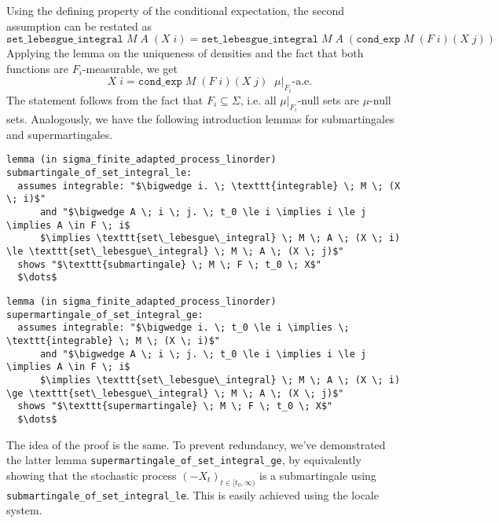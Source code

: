 Using the defining property of the conditional expectation, the second assumption can be restated as
\[
	\texttt{set\_lebesgue\_integral} \; M \; A \; (X \; i) = \texttt{set\_lebesgue\_integral} \; M \; A \; (\texttt{cond\_exp} \; M \; (F \; i) (X \; j))
\]
Applying the lemma on the uniqueness of densities and the fact that both functions are $F_i$-measurable, we get
\[
	\quad X \; i = \texttt{cond\_exp} \; M \; (F \; i) (X \; j) \;\; \mu\vert_{F_i}\textrm{-a.e.}
\]
The statement follows from the fact that $F_i \subseteq \Sigma$, i.e. all $\mu\vert_{F_i}$-null sets are $\mu$-null sets. Analogously, we have the following introduction lemmas for submartingales and supermartingales.

\begin{isalemma}
{\small
\begin{lstlisting}[style=isabelle]
lemma (in sigma_finite_adapted_process_linorder) submartingale_of_set_integral_le:
  assumes integrable: "$\bigwedge i. \; \texttt{integrable} \; M \; (X \; i)$"
      and "$\bigwedge A \; i \; j. \; t_0 \le i \implies i \le j \implies A \in F \; i$
	  $\implies \texttt{set\_lebesgue\_integral} \; M \; A \; (X \; i) \le \texttt{set\_lebesgue\_integral} \; M \; A \; (X \; j)$" 
  shows "$\texttt{submartingale} \; M \; F \; t_0 \; X$"
  $\dots$
\end{lstlisting}
}
\end{isalemma}

\begin{isalemma}
{\small
\begin{lstlisting}[style=isabelle]
lemma (in sigma_finite_adapted_process_linorder) supermartingale_of_set_integral_ge:
  assumes integrable: "$\bigwedge i. \; t_0 \le i \implies \; \texttt{integrable} \; M \; (X \; i)$"
      and "$\bigwedge A \; i \; j. \; t_0 \le i \implies i \le j \implies A \in F \; i$
	  $\implies \texttt{set\_lebesgue\_integral} \; M \; A \; (X \; i) \ge \texttt{set\_lebesgue\_integral} \; M \; A \; (X \; j)$" 
  shows "$\texttt{supermartingale} \; M \; F \; t_0 \; X$"
  $\dots$
\end{lstlisting}
}
\end{isalemma}

The idea of the proof is the same. To prevent redundancy, we've demonstrated the latter lemma \texttt{supermartingale\_of\_set\_integral\_ge}, by equivalently showing that the stochastic process $(-X_t)_{t \in [t_0,\infty)}$ is a submartingale using \texttt{submartingale\_of\_set\_integral\_le}. This is easily achieved using the locale system.

